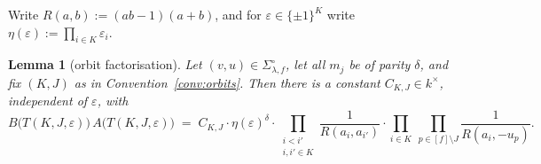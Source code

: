 \documentclass[11pt]{article}
\newtheorem{lemma}[theorem]{Lemma}
\theoremstyle{definition}
\theoremstyle{remark}
\begin{document}
Write $R(a,b):=(ab-1)(a+b)$, and for $\varepsilon\in\{\pm1\}^K$ write
$\eta(\varepsilon):=\prod_{i\in K}\varepsilon_i$.

\begin{lemma}[orbit factorisation]\label{lem:bridge}
Let $(v,u)\in\Sigma^{\circ}_{\lambda,f}$, let all $m_j$ be of parity $\delta$, and fix
$(K,J)$ as in Convention~\ref{conv:orbits}. Then there is a constant
$C_{K,J}\in k^{\times}$, independent of $\varepsilon$, with
\begin{equation}\label{eq:bridge}
  B\bigl(T(K,J,\varepsilon)\bigr)\,A\bigl(T(K,J,\varepsilon)\bigr)
  \;=\; C_{K,J}\cdot\eta(\varepsilon)^{\delta}\cdot
  \prod_{\substack{i<i'\\ i,i'\in K}}\frac{1}{R(a_i,a_{i'})}\cdot
  \prod_{i\in K}\ \prod_{p\in[f]\setminus J}\frac{1}{R(a_i,-u_p)} .
\end{equation}
\end{lemma}
\end{document}
